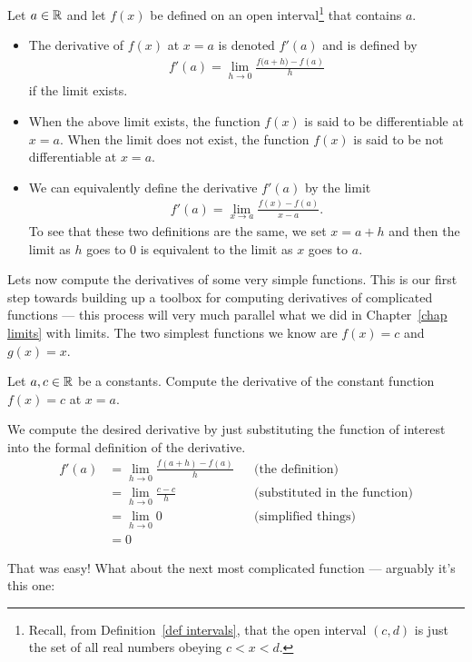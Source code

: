 \begin{defn}\label{def:DIFFderiv}
Let $a\in\mathbb{R}$ and let $f(x)$ be defined on an open interval\footnote{
  Recall, from Definition~\ref{def intervals}, that the open interval $(c,d)$ is
  just the set of all real numbers obeying $c<x<d$.}
that contains $a$.
\begin{itemize}
 \item The derivative of $f(x)$ at $x=a$ is denoted
$f'(a)$ and is defined by
\begin{align*}
f'(a)=\lim_{h\rightarrow 0}\frac{f\big(a+h\big)-f(a)}{h}
\end{align*}
if the limit exists.
\item When the above limit exists, the function $f(x)$ is said
to be differentiable at $x=a$. When the limit does not  exist, the
function $f(x)$ is said to be not differentiable at $x=a$.

\item We can equivalently define the derivative $f'(a)$ by the limit
\begin{align*}
f'(a)=\lim_{x\rightarrow a}\frac{f(x)-f(a)}{x-a}.
\end{align*}
To see that these two definitions are the same, we set $x=a+h$ and then the limit as
$h$ goes to $0$ is equivalent to the limit as $x$ goes to $a$.
\end{itemize}
\end{defn}


Lets now compute the derivatives of some very simple functions. This is our first step
towards building up a toolbox for computing derivatives of complicated functions ---
this process will very much parallel what we did in Chapter~\ref{chap limits} with
limits. The two simplest functions we know are $f(x)=c$ and $g(x)=x$.
\begin{eg}[Derivative of $f(x)=c$]\label{eg:DIFFderivX0}
Let $a, c \in \mathbb{R}$ be a constants. Compute the derivative of the constant function
$f(x) = c$ at $x=a$.

We compute the desired derivative by just substituting the function
of interest into the formal definition of the derivative.
\begin{align*}
  f'(a) &= \lim_{h \to 0} \frac{f(a+h) - f(a)}{h} && \text{(the definition)}\\
  &= \lim_{h \to 0} \frac{c - c}{h} && \text{(substituted in the function)} \\
  &= \lim_{h \to 0} 0 &&\text{(simplified things)}\\
  &= 0
\end{align*}
\end{eg}
That was easy! What about the next most complicated function ---
arguably it's this one:


